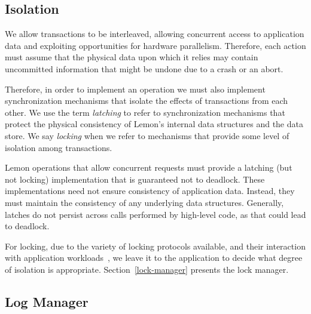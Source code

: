 \documentclass[10pt,letterpaper,twocolumn,english]{article}
\newcommand{\yad}{Lemon\xspace}
\begin{document}
\subsection{Isolation}
\label{Isolation}

We allow transactions to be interleaved, allowing concurrent access to
application data and exploiting opportunities for hardware
parallelism.  Therefore, each action must assume that the
physical data upon which it relies may contain uncommitted
information that might be undone due to a crash or an abort.


Therefore, in order to implement an operation we must also implement
synchronization mechanisms that isolate the effects of transactions
from each other.  We use the term {\em latching} to refer to
synchronization mechanisms that protect the physical consistency of
\yad's internal data structures and the data store.  We say {\em
locking} when we refer to mechanisms that provide some level of
isolation among transactions.  

\yad operations that allow concurrent requests must provide a latching
(but not locking) implementation that is guaranteed not to deadlock.
These implementations need not ensure consistency of application data.
Instead, they must maintain the consistency of any underlying data
structures.  Generally, latches do not persist across calls performed
by high-level code, as that could lead to deadlock.

For locking, due to the variety of locking protocols available, and
their interaction with application
workloads~\cite{multipleGenericLocking}, we leave it to the
application to decide what degree of isolation is
appropriate. Section~\ref{lock-manager} presents the lock manager.




\subsection{Log Manager}
\label{log-manager}
\end{document}
